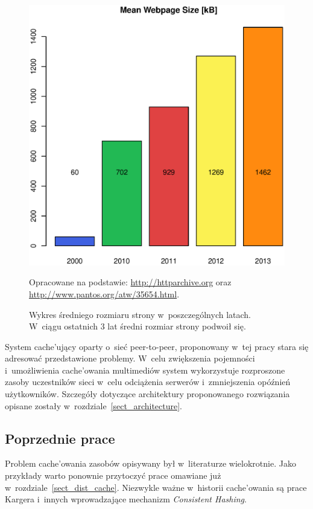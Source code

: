 \documentclass[a4paper,11pt]{scrartcl}
\newcommand{\s}{ }
\newcommand{\keszujacy}{cache'ujący}
\newcommand{\keszowania}{cache'owania}
\begin{document}
\begin{figure}[h!]
\centering
\includegraphics[width=0.7\linewidth]{img/mean_webpage_size.eps}
\caption*{Opracowane na podstawie: \url{http://httparchive.org} oraz \url{http://www.pantos.org/atw/35654.html}.}
\caption{Wykres średniego rozmiaru strony w~poszczególnych latach. W~ciągu ostatnich 3 lat średni rozmiar strony podwoił się.}
\label{fig_mean_webpage}
\end{figure}

System \keszujacy\s oparty o~sieć peer-to-peer, proponowany w~tej pracy stara się adresować przedstawione problemy. W~celu zwiększenia pojemności i~umożliwienia \keszowania\s multimediów system wykorzystuje rozproszone zasoby uczestników sieci w~celu odciążenia serwerów i~zmniejszenia opóźnień użytkowników. Szczegóły dotyczące architektury proponowanego rozwiązania opisane zostały w~rozdziale~\ref{sect_architecture}.

\subsection{Poprzednie prace}
\label{sect_previous_work}
Problem \keszowania\s zasobów opisywany był w~literaturze wielokrotnie. Jako przykłady warto ponownie przytoczyć prace \cite{malpani1995making, chankhunthod1995hierarchical, povey1997distributed} omawiane już w~rozdziale~\ref{sect_dist_cache}. Niezwykle ważne w~historii \keszowania\s są prace Kargera i~innych \cite{karger1997consistent, karger1999web} wprowadzające mechanizm \textit{Consistent Hashing}.
\end{document}
